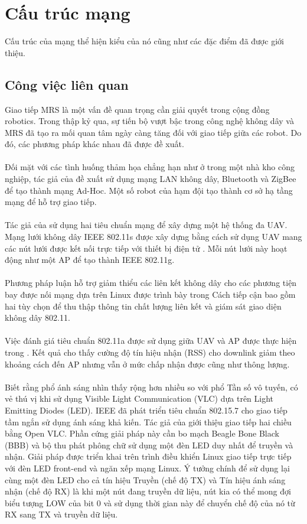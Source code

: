 \documentclass[11pt,openany]{book}
\begin{document}
\section{Cấu trúc mạng}
Cấu trúc của mạng thể hiện kiểu của nó cũng như các đặc điểm đã được giới thiệu.
\subsection{Công việc liên quan}
Giao tiếp MRS là một vấn đề quan trọng cần giải quyết trong cộng đồng robotics. Trong thập kỷ qua, sự tiến bộ vượt bậc trong công nghệ không dây và MRS đã tạo ra mối quan tâm ngày càng tăng đối với giao tiếp giữa các robot. Do đó, các phương pháp khác nhau đã được đề xuất.\\\\
Đối mặt với các tình huống thảm họa chẳng hạn như ở trong một nhà kho công nghiệp, tác giả của \cite{witkowski2008ad} đề xuất sử dụng mạng LAN không dây, Bluetooth và ZigBee để tạo thành mạng Ad-Hoc. Một số robot của hạm đội tạo thành cơ sở hạ tầng mạng để hỗ trợ giao tiếp.\\\\
Tác giả của \cite{morgenthaler2012uavnet} sử dụng hai tiêu chuẩn mạng để xây dựng một hệ thống đa UAV. Mạng lưới không dây IEEE 802.11s được xây dựng bằng cách sử dụng UAV mang các nút lưới được kết nối trực tiếp với thiết bị điện tử . Mỗi nút lưới này hoạt động như một AP để tạo thành IEEE 802.11g.\\\\
Phương pháp luận hỗ trợ giảm thiểu các liên kết không dây cho các phương tiện bay được nối mạng dựa trên Linux được trình bày trong \cite{kuschnig2012profiling.} Cách tiếp cận bao gồm hai tùy chọn để thu thập thông tin chất lượng liên kết và giám sát giao diện không dây 802.11.\\\\
Việc đánh giá tiêu chuẩn 802.11a được sử dụng giữa UAV và AP được thực hiện trong \cite{kuschnig2012profiling}. Kết quả cho thấy cường độ tín hiệu nhận (RSS) cho downlink giảm theo khoảng cách đến AP nhưng vẫn ở mức chấp nhận được cũng như thông lượng.\\\\
Biết rằng phổ ánh sáng nhìn thấy rộng hơn nhiều so với phổ Tần số vô tuyến, có vẻ thú vị khi sử dụng Visible Light Communication (VLC) dựa trên Light Emitting Diodes (LED). IEEE đã phát triển tiêu chuẩn 802.15.7 cho giao tiếp tầm ngắn sử dụng ánh sáng khả kiến. Tác giả của \cite{wang2014openvlc} giới thiệu giao tiếp hai chiều bằng Open VLC. Phần cứng giải pháp này cần bo mạch Beagle Bone Black (BBB) và bộ thu phát phông chữ sử dụng một đèn LED duy nhất để truyền và nhận. Giải pháp được triển khai trên trình điều khiển Linux giao tiếp trực tiếp với đèn LED front-end và ngăn xếp mạng Linux. Ý tưởng chính để sử dụng lại cùng một đèn LED cho cả tín hiệu Truyền (chế độ TX) và Tín hiệu ánh sáng nhận (chế độ RX) là khi một nút đang truyền dữ liệu, nút kia có thể mong đợi biểu tượng LOW của bit 0 và sử dụng thời gian này để chuyển chế độ của nó từ RX sang TX và truyền dữ liệu.\\\\
\end{document}
